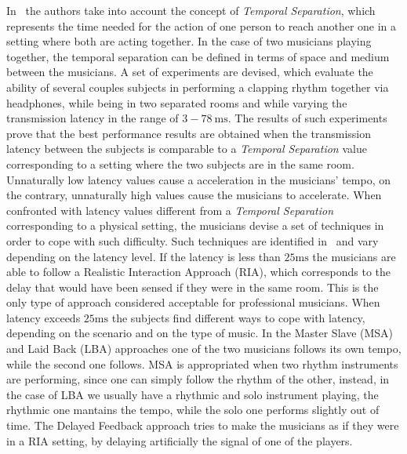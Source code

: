 In~\cite{Chafe1,Chafe2,Chafe3} the authors take into account the concept of \textit{Temporal Separation}, which represents the time needed for the action of one person to reach another one in a setting where both are acting together. In the case of two musicians playing together, the temporal separation can be defined in terms of space and medium between the musicians. A set of experiments are devised, which evaluate the ability of several couples subjects in performing a clapping rhythm together via headphones, while being in two separated rooms and while varying the transmission latency in the range of $3-78~\mathrm{ms}$. The results of such experiments prove that the best performance results are obtained when the transmission latency between the subjects is comparable to a \textit{Temporal Separation} value corresponding to a setting where the two subjects are in the same room. Unnaturally low latency values cause a acceleration in the musicians' tempo, on the contrary, unnaturally high values cause the musicians to accelerate.
When confronted with latency values different from a \textit{Temporal Separation} corresponding to a physical setting, the musicians devise a set of techniques in order to cope with such difficulty. Such techniques are identified in~\cite{Carot07networkmusic} and vary depending on the latency level. If the latency is less than $25\mathrm{ms}$ the musicians are able to follow a Realistic Interaction Approach (RIA), which corresponds to the delay that would have been sensed if they were in the same room. This is the only type of approach considered acceptable for professional musicians. When latency exceeds $25\mathrm{ms}$ the subjects find different ways to cope with latency, depending on the scenario and on the type of music. In the Master Slave (MSA) and Laid Back (LBA) approaches one of the two musicians follows its own tempo, while the second one follows. MSA is appropriated when two rhythm instruments are performing, since one can simply follow the rhythm of the other, instead, in the case of LBA we usually have a rhythmic and solo instrument playing, the rhythmic one mantains the tempo, while the solo one performs slightly out of time. The Delayed Feedback approach tries to make the musicians as if they were in a RIA setting, by delaying artificially the signal of one of the players.

